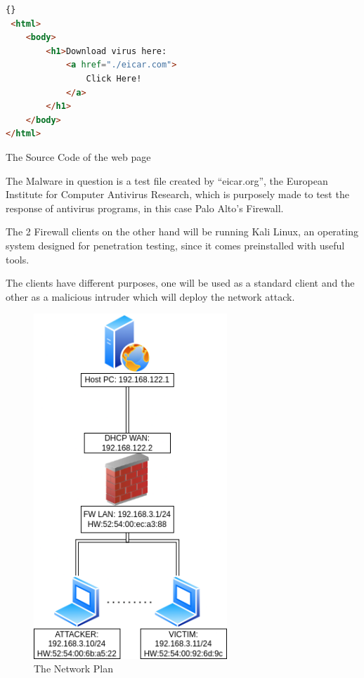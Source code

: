 \begin{lstlisting}[language=html]{}
 <html>
    <body>
        <h1>Download virus here:
            <a href="./eicar.com">
                Click Here!
            </a>
        </h1>
    </body>
</html>
\end{lstlisting}

\begin{center}
The Source Code of the web page
\end{center}


The Malware in question is a test file created by ``eicar.org'', the European Institute for Computer Antivirus Research, which is purposely made to test the response of antivirus programs\cite{eicar}, in this case Palo Alto's Firewall.

The 2 Firewall clients on the other hand will be running  Kali Linux, an operating system designed for penetration testing, since it comes preinstalled with useful tools.

The clients have different purposes, one will be used as a standard client and the other as a malicious intruder which will deploy the network attack.

\begin{figure}[h!]
 \centering
 \includegraphics[height=13cm]{img/Network_Plan.png}
 \caption{The Network Plan}
 \label{fig: network-plan}
\end{figure}




